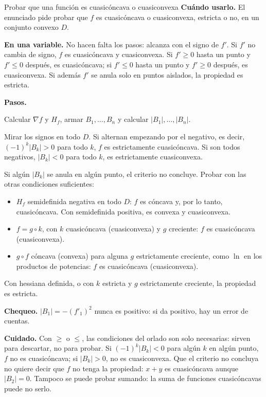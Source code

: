 \documentclass{article}
\newcommand{\rotulo}[2][principal]{\textsf{\bfseries\color{#1}#2}\enspace}
\begin{document}
\begin{metodo}[label=met:cuasi]{Probar que una función es cuasicóncava o cuasiconvexa}
\rotulo{Cuándo usarlo.} El enunciado pide probar que \(f\) es cuasicóncava o cuasiconvexa, estricta o no, en un conjunto convexo \(D\).

\rotulo{En una variable.} No hacen falta los pasos: alcanza con el signo de \(f'\). Si \(f'\) no cambia de signo, \(f\) es cuasicóncava y cuasiconvexa. Si \(f'\ge0\) hasta un punto y \(f'\le0\) después, es cuasicóncava; si \(f'\le0\) hasta un punto y \(f'\ge0\) después, es cuasiconvexa. Si además \(f'\) se anula solo en puntos aislados, la propiedad es estricta.

\rotulo{Pasos.}
\begin{pasos}
  \item Calcular \(\nabla f\) y \(H_f\), armar \(B_1,\dots,B_n\) y calcular \(|B_1|,\dots,|B_n|\).
  \item Mirar los signos en todo \(D\). Si alternan empezando por el negativo, es decir, \((-1)^k|B_k|>0\) para todo \(k\), \(f\) es estrictamente cuasicóncava. Si son todos negativos, \(|B_k|<0\) para todo \(k\), es estrictamente cuasiconvexa.
  \item Si algún \(|B_k|\) se anula en algún punto, el criterio no concluye. Probar con las otras condiciones suficientes:
  \begin{itemize}[nosep]
    \item \(H_f\) semidefinida negativa en todo \(D\): \(f\) es cóncava y, por lo tanto, cuasicóncava. Con semidefinida positiva, es convexa y cuasiconvexa.
    \item \(f=g\circ k\), con \(k\) cuasicóncava (cuasiconvexa) y \(g\) creciente: \(f\) es cuasicóncava (cuasiconvexa).
    \item \(g\circ f\) cóncava (convexa) para alguna \(g\) estrictamente creciente, como \(\ln\) en los productos de potencias: \(f\) es cuasicóncava (cuasiconvexa).
  \end{itemize}
  Con hessiana definida, o con \(k\) estricta y \(g\) estrictamente creciente, la propiedad es estricta.
\end{pasos}

\rotulo{Chequeo.} \(|B_1|=-(f'_1)^2\) nunca es positivo: si da positivo, hay un error de cuentas.

\rotulo[oxido]{Cuidado.} Con \(\ge\) o \(\le\), las condiciones del orlado son solo necesarias: sirven para descartar, no para probar. Si \((-1)^k|B_k|<0\) para algún \(k\) en algún punto, \(f\) no es cuasicóncava; si \(|B_k|>0\), no es cuasiconvexa. Que el criterio no concluya no quiere decir que \(f\) no tenga la propiedad: \(x+y\) es cuasicóncava aunque \(|B_2|=0\). Tampoco se puede probar sumando: la suma de funciones cuasicóncavas puede no serlo.
\end{metodo}
\end{document}
